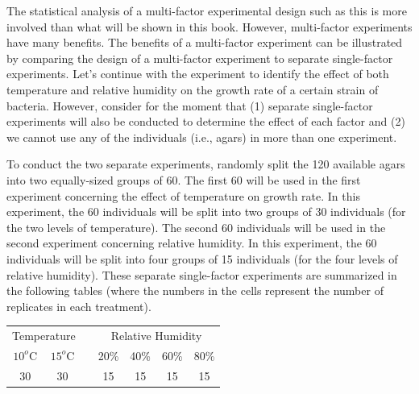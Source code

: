 \documentclass[10pt,openany]{book}\usepackage[]{graphicx}\usepackage[]{color}
\begin{document}

\vspace{-12pt}

\vspace{-12pt}

The statistical analysis of a multi-factor experimental design such as this is more involved than what will be shown in this book.  However, multi-factor experiments have many benefits.  The benefits of a multi-factor experiment can be illustrated by comparing the design of a multi-factor experiment to separate single-factor experiments.  Let's continue with the experiment to identify the effect of both temperature and relative humidity on the growth rate of a certain strain of bacteria.  However, consider for the moment that (1) separate single-factor experiments will also be conducted to determine the effect of each factor and (2) we cannot use any of the individuals (i.e., agars) in more than one experiment.

To conduct the two separate experiments, randomly split the 120 available agars into two equally-sized groups of 60.  The first 60 will be used in the first experiment concerning the effect of temperature on growth rate.  In this experiment, the 60 individuals will be split into two groups of 30 individuals (for the two levels of temperature).  The second 60 individuals will be used in the second experiment concerning relative humidity.  In this experiment, the 60 individuals will be split into four groups of 15 individuals (for the four levels of relative humidity).  These separate single-factor experiments are summarized in the following tables (where the numbers in the cells represent the number of replicates in each treatment).

\begin{center}
\begin{tabular}{|c|c|c|c|c|c|c|}
\multicolumn{2}{c}{Temperature} & \multicolumn{1}{c}{} & \multicolumn{4}{c}{Relative Humidity} \\
\cline{1-2}\cline{4-7}
$10^{o}$C & $15^{o}$C & & 20\% & 40\% & 60\% & 80\% \\
\cline{1-2}\cline{4-7}
30 & 30 & & 15 & 15 & 15 & 15 \\
\cline{1-2}\cline{4-7}
\end{tabular}
\end{center}
\end{document}

